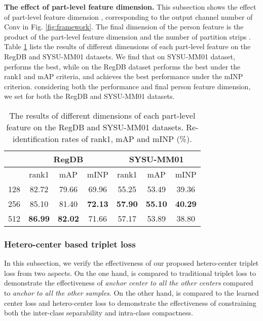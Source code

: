 \documentclass[journal]{IEEEtran}
\begin{document}
\textbf{The effect of part-level feature dimension.} This subsection shows the effect of part-level feature dimension , corresponding to the output channel number of  Conv in Fig. \ref{fig:framework}. The final dimension of the person feature is the product of the part-level feature dimension  and the number of partition strips . Table \ref{tab:dimension} lists the results of different dimensions of each part-level feature  on the RegDB and SYSU-MM01 datasets. We find that on SYSU-MM01 dataset,  performs the best, while on the RegDB dataset  performs the best under the rank1 and mAP criteria, and  achieves the best performance under the mINP criterion.
considering both the performance and final person feature dimension, we set  for both the RegDB and SYSU-MM01 datasets.


\begin{table}
\caption{The results of different dimensions of each part-level feature  on the RegDB and SYSU-MM01 datasets. Re-identification rates of rank1, mAP and mINP (\%).}
\label{tab:dimension}
  \centering
\begin{tabular}{l|c|c|c|c|c|c}
   \toprule[2pt]
    & \multicolumn{3}{c|}{RegDB} & \multicolumn{3}{c}{SYSU-MM01}\\ \hline
     & rank1 & mAP & mINP & rank1 & mAP & mINP \\ \toprule[1pt]
    128 & 82.72 & 79.66 & 69.96 & 55.25 & 53.49 & 39.36\\
    256 & 85.10 & 81.40 & \textbf{72.13} & \textbf{57.90} & \textbf{55.10} & \textbf{40.29} \\
    512 & \textbf{86.99} & \textbf{82.02} & 71.66 & 57.17 & 53.89 & 38.80\\ \toprule[2pt]
  \end{tabular}
\end{table}

\subsubsection{Hetero-center based triplet loss}
\label{sssec:ctri}

In this subsection, we verify the effectiveness of our proposed hetero-center triplet loss  from two aspects. On the one hand,  is compared to traditional triplet loss  to demonstrate the effectiveness of \emph{anchor center to all the other centers} compared to \emph{anchor to all the other samples}. On the other hand,  is compared to the learned center loss  and hetero-center loss  to demonstrate the effectiveness of constraining both the inter-class separability and intra-class compactness.
\end{document}
